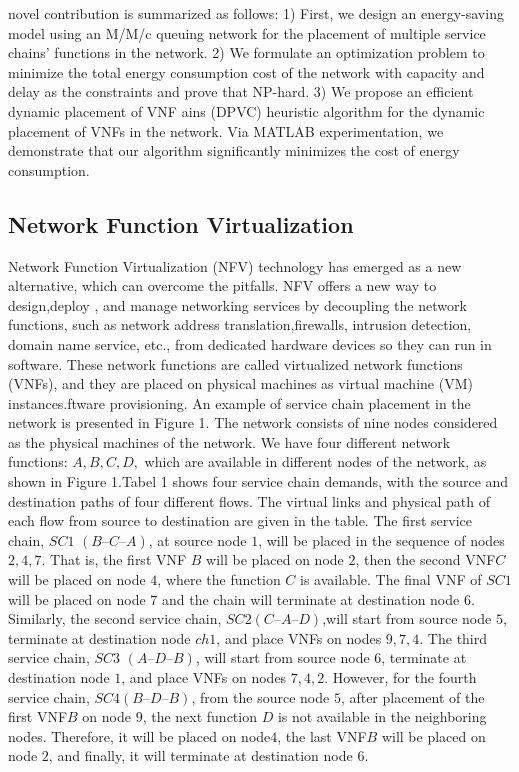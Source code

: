 \documentclass[12pt]{article}
\begin{document}
novel contribution is summarized as follows:
1) First, we design an energy-saving model using an
M/M/c queuing network
for the placement of multiple service chains’
functions in the network.
2) We formulate an optimization problem to minimize
the total energy consumption cost of the network
with capacity and delay as the constraints and prove
that NP-hard.
3) We propose an efficient dynamic placement of VNF ains (DPVC) heuristic algorithm for the dynamic
placement of VNFs in the network. Via MATLAB
experimentation, we demonstrate that our algorithm
significantly minimizes the cost of energy
consumption.

\subsection{Network Function Virtualization}
Network Function Virtualization (NFV)  technology has emerged as a new alternative, which can overcome the pitfalls. NFV offers a new way to design,deploy , and manage networking services by decoupling the network functions, such as network address translation,firewalls, intrusion detection, domain name service, etc., from dedicated hardware devices so they can run in software. These network functions are called virtualized network functions (VNFs), and they are placed on physical machines as virtual machine (VM) instances.ftware provisioning. An example of service chain placement
in the network is presented in Figure 1. The network consists
of nine nodes considered as the physical machines of the
network. We have four different network functions: $ A, B, C,
D,$ which are available in different nodes of the network, as
shown in Figure 1.Tabel 1 shows four service chain demands,
with the source and destination paths of four different flows.
The virtual links and physical path of each flow from source to
destination are  given in the table. The first service chain, $SC1$
$(B–C–A)$, at source node $1$, will be placed in the sequence of
nodes $2, 4, 7$. That is, the first VNF $B$ will be placed on node
$2$, then the second VNF$C$ will be placed on node $4$, where
the function $C$ is available. The final VNF of $SC1$ will be
placed on node $7$ and the chain will terminate at destination
node $6$. Similarly, the second service chain, $SC2$$ (C–A–D)$,will start from source node $5$, terminate at destination node $
ch 1$,
and place VNFs on nodes $9, 7, 4$. The third service chain, $SC3$
$(A–D–B)$, will start from source node $6$, terminate at
destination node $1$, and place VNFs on nodes $7,4, 2$.
However, for the fourth service chain, $SC4 (B–D–B)$, from the
source node $5$, after placement of the first VNF$B$ on node $9$,
the next function $D$ is not available in the neighboring nodes.
Therefore, it will be placed on node$ 4$, the last VNF$B$ will
be placed on node $2$, and finally, it will terminate at 
destination node $6$. 
\end{document}
